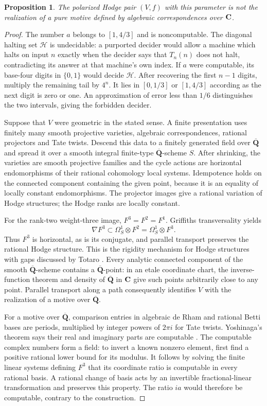 \documentclass[11pt]{article}
\newtheorem{proposition}[theorem]{Proposition}
\theoremstyle{definition}\newtheorem{definition}[theorem]{Definition}
\theoremstyle{remark}\newtheorem{remark}[theorem]{Remark}
\newcommand{\Qb}{\overline{\mathbf Q}}\newcommand{\Fp}{\mathbf F_p}
\begin{document}
\begin{proposition}\label{prop:nong}
The polarized Hodge pair $(V,f)$ with this parameter is not the realization of a pure motive defined by algebraic correspondences over $\mathbf C$.
\end{proposition}
\begin{proof}
The number $a$ belongs to $[1,4/3]$ and is noncomputable. The diagonal halting set $\mathcal H$ is undecidable: a purported decider would allow a machine which halts on input $n$ exactly when the decider says that $T_n(n)$ does not halt, contradicting its answer at that machine's own index. If $a$ were computable, its base-four digits in $\{0,1\}$ would decide $\mathcal H$. After recovering the first $n-1$ digits, multiply the remaining tail by $4^n$. It lies in $[0,1/3]$ or $[1,4/3]$ according as the next digit is zero or one. An approximation of error less than $1/6$ distinguishes the two intervals, giving the forbidden decider.

Suppose that $V$ were geometric in the stated sense. A finite presentation uses finitely many smooth projective varieties, algebraic correspondences, rational projectors and Tate twists. Descend this data to a finitely generated field over $\Qb$ and spread it over a smooth integral finite-type $\Qb$-scheme $S$. After shrinking, the varieties are smooth projective families and the cycle actions are horizontal endomorphisms of their rational cohomology local systems. Idempotence holds on the connected component containing the given point, because it is an equality of locally constant endomorphisms. The projector images give a rational variation of Hodge structures; the Hodge ranks are locally constant.

For the rank-two weight-three image, $F^3=F^2=F^1$. Griffiths transversality yields
\[
                  \nabla F^3\subset\Omega^1_S\otimes F^2
                            =\Omega^1_S\otimes F^3.
\]
Thus $F^3$ is horizontal, as is its conjugate, and parallel transport preserves the rational Hodge structure. This is the rigidity mechanism for Hodge structures with gaps discussed by Totaro \cite[pp.~1--2]{Totaro}. Every analytic connected component of the smooth $\Qb$-scheme contains a $\Qb$-point: in an etale coordinate chart, the inverse-function theorem and density of $\Qb$ in $\mathbf C$ give such points arbitrarily close to any point. Parallel transport along a path consequently identifies $V$ with the realization of a motive over $\Qb$.

For a motive over $\Qb$, comparison entries in algebraic de Rham and rational Betti bases are periods, multiplied by integer powers of $2\pi i$ for Tate twists. Yoshinaga's theorem says their real and imaginary parts are computable \cite[Theorem 18, p.~11]{Yoshinaga}. The computable complex numbers form a field: to invert a known nonzero element, first find a positive rational lower bound for its modulus. It follows by solving the finite linear systems defining $F^3$ that its coordinate ratio is computable in every rational basis. A rational change of basis acts by an invertible fractional-linear transformation and preserves this property. The ratio $ia$ would therefore be computable, contrary to the construction.
\end{proof}
\end{document}
